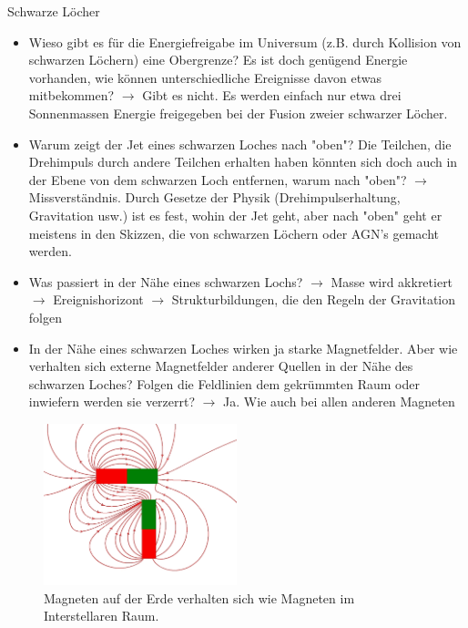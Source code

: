 \begin{frame}{Schwarze Löcher}
  \begin{itemize}
    \setlength\itemsep{2em}
    \item Wieso gibt es für die Energiefreigabe im Universum (z.B. durch
    Kollision von schwarzen Löchern) eine Obergrenze? Es ist doch genügend
    Energie vorhanden, wie können unterschiedliche Ereignisse davon etwas
    mitbekommen?
   $\longrightarrow$ Gibt es nicht. Es werden einfach nur etwa drei Sonnenmassen
   Energie freigegeben bei der Fusion zweier schwarzer Löcher.
   \item Warum zeigt der Jet eines schwarzen Loches nach "oben"?
   Die Teilchen, die Drehimpuls durch andere Teilchen erhalten
   haben könnten sich doch auch in der Ebene von dem schwarzen Loch entfernen,
   warum nach "oben"?
   $\longrightarrow$ Missverständnis. Durch Gesetze der Physik
   (Drehimpulserhaltung, Gravitation usw.) ist es fest, wohin der Jet geht, aber
   nach "oben" geht er meistens in den Skizzen, die von schwarzen Löchern oder
   AGN's gemacht werden.
   \item Was passiert in der Nähe eines schwarzen Lochs?
   $\longrightarrow$ Masse wird akkretiert
   $\longrightarrow$ Ereignishorizont
   $\longrightarrow$ Strukturbildungen, die den Regeln der Gravitation folgen
\end{itemize}

\end{frame}

\begin{frame}
  \begin{itemize}
    \setlength\itemsep{2em}
    \item In der Nähe eines schwarzen Loches wirken ja starke Magnetfelder. Aber
    wie verhalten sich externe Magnetfelder anderer Quellen in der Nähe des
    schwarzen Loches? Folgen die Feldlinien dem gekrümmten Raum oder inwiefern
    werden sie verzerrt?
    $\longrightarrow$ Ja. Wie auch bei allen anderen Magneten
  \end{itemize}
\begin{figure}[H]
  \centering
  \includegraphics[width=0.5\textwidth]{images/Frage3.PNG}
  \caption{Magneten auf der Erde verhalten sich wie Magneten im Interstellaren Raum.}
\end{figure}
\end{frame}

